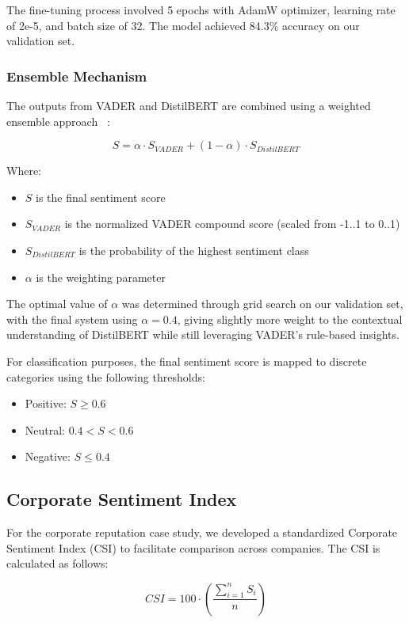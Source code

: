 \documentclass[conference]{IEEEtran}
\begin{document}
The fine-tuning process involved 5 epochs with AdamW optimizer, learning rate of 2e-5, and batch size of 32. The model achieved 84.3\% accuracy on our validation set.

\subsubsection{Ensemble Mechanism}
The outputs from VADER and DistilBERT are combined using a weighted ensemble approach ~\cite{hex2023vader}:

\begin{equation}
S = \alpha \cdot S_{VADER} + (1-\alpha) \cdot S_{DistilBERT} 
\end{equation}

Where:
\begin{itemize}
    \item $S$ is the final sentiment score
    \item $S_{VADER}$ is the normalized VADER compound score (scaled from -1..1 to 0..1)
    \item $S_{DistilBERT}$ is the probability of the highest sentiment class
    \item $\alpha$ is the weighting parameter
\end{itemize}

The optimal value of $\alpha$ was determined through grid search on our validation set, with the final system using $\alpha = 0.4$, giving slightly more weight to the contextual understanding of DistilBERT while still leveraging VADER's rule-based insights.

For classification purposes, the final sentiment score is mapped to discrete categories using the following thresholds:
\begin{itemize}
    \item Positive: $S \geq 0.6$
    \item Neutral: $0.4 < S < 0.6$
    \item Negative: $S \leq 0.4$
\end{itemize}

\subsection{Corporate Sentiment Index}
For the corporate reputation case study, we developed a standardized Corporate Sentiment Index (CSI) to facilitate comparison across companies. The CSI is calculated as follows:

\begin{equation}
CSI = 100 \cdot \left( \frac{\sum_{i=1}^{n} S_i}{n} \right)
\end{equation}
\end{document}
